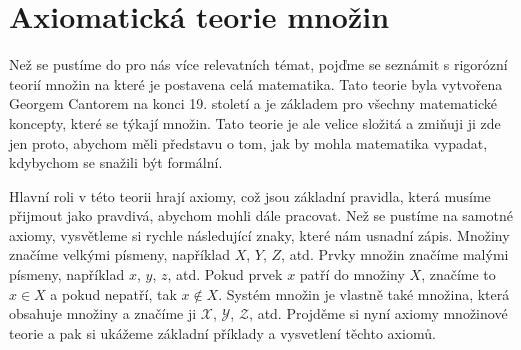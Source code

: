 
\section{Axiomatická teorie množin}
Než se pustíme do pro nás více relevatních témat, pojďme se seznámit s rigorózní teorií množin na které je postavena celá matematika. Tato teorie byla vytvořena Georgem Cantorem na konci 19. století a je základem pro všechny matematické koncepty, které se týkají množin. Tato teorie je ale velice složitá a zmiňuji ji zde jen proto, abychom měli představu o tom, jak by mohla matematika vypadat, kdybychom se snažili být formální.

Hlavní roli v této teorii hrají axiomy, což jsou základní pravidla, která musíme přijmout jako pravdivá, abychom mohli dále pracovat. Než se pustíme na samotné axiomy, vysvětleme si rychle následující znaky, které nám usnadní zápis. Množiny značíme velkými písmeny, například $X$, $Y$, $Z$, atd. Prvky množin značíme malými písmeny, například $x$, $y$, $z$, atd. Pokud prvek $x$ patří do množiny $X$, značíme to $x\in X$ a pokud nepatří, tak $x\notin X$. Systém množin je vlastně také množina, která obsahuje množiny a značíme ji $\mathcal{X}$, $\mathcal{Y}$, $\mathcal{Z}$, atd. Projděme si nyní axiomy množinové teorie a pak si ukážeme základní příklady a vysvetlení těchto axiomů. 

